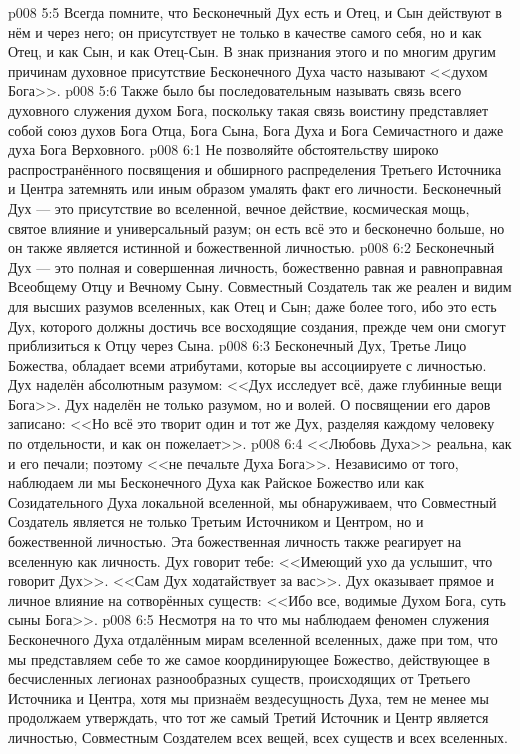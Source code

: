 \vs p008 5:5 Всегда помните, что Бесконечный Дух есть  и Отец, и Сын действуют в нём и через него; он присутствует не только в качестве самого себя, но и как Отец, и как Сын, и как Отец\hyp{}Сын. В знак признания этого и по многим другим причинам духовное присутствие Бесконечного Духа часто называют <<духом Бога>>.
\vs p008 5:6 Также было бы последовательным называть связь всего духовного служения духом Бога, поскольку такая связь воистину представляет собой союз духов Бога Отца, Бога Сына, Бога Духа и Бога Семичастного и даже духа Бога Верховного.
\vs p008 6:1 Не позволяйте обстоятельству широко распространённого посвящения и обширного распределения Третьего Источника и Центра затемнять или иным образом умалять факт его личности. Бесконечный Дух --- это присутствие во вселенной, вечное действие, космическая мощь, святое влияние и универсальный разум; он есть всё это и бесконечно больше, но он также является истинной и божественной личностью.
\vs p008 6:2 Бесконечный Дух --- это полная и совершенная личность, божественно равная и равноправная Всеобщему Отцу и Вечному Сыну. Совместный Создатель так же реален и видим для высших разумов вселенных, как Отец и Сын; даже более того, ибо это есть Дух, которого должны достичь все восходящие создания, прежде чем они смогут приблизиться к Отцу через Сына.
\vs p008 6:3 Бесконечный Дух, Третье Лицо Божества, обладает всеми атрибутами, которые вы ассоциируете с личностью. Дух наделён абсолютным разумом: <<Дух исследует всё, даже глубинные вещи Бога>>. Дух наделён не только разумом, но и волей. О посвящении его даров записано: <<Но всё это творит один и тот же Дух, разделяя каждому человеку по отдельности, и как он пожелает>>.
\vs p008 6:4 <<Любовь Духа>> реальна, как и его печали; поэтому <<не печальте Духа Бога>>. Независимо от того, наблюдаем ли мы Бесконечного Духа как Райское Божество или как Созидательного Духа локальной вселенной, мы обнаруживаем, что Совместный Создатель является не только Третьим Источником и Центром, но и божественной личностью. Эта божественная личность также реагирует на вселенную как личность. Дух говорит тебе: <<Имеющий ухо да услышит, что говорит Дух>>. <<Сам Дух ходатайствует за вас>>. Дух оказывает прямое и личное влияние на сотворённых существ: <<Ибо все, водимые Духом Бога, суть сыны Бога>>.
\vs p008 6:5 Несмотря на то что мы наблюдаем феномен служения Бесконечного Духа отдалённым мирам вселенной вселенных, даже при том, что мы представляем себе то же самое координирующее Божество, действующее в бесчисленных легионах разнообразных существ, происходящих от Третьего Источника и Центра, хотя мы признаём вездесущность Духа, тем не менее мы продолжаем утверждать, что тот же самый Третий Источник и Центр является личностью, Совместным Создателем всех вещей, всех существ и всех вселенных.
